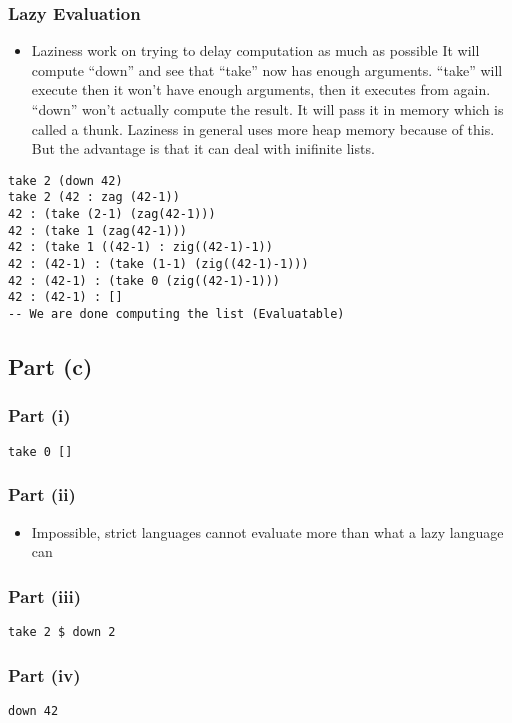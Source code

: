 \documentclass[11pt]{article}
\begin{document}
\subsubsection{Lazy Evaluation}
\label{sec:org720641f}
\begin{itemize}
\item Laziness work on trying to delay computation as much as possible
It will compute ``down'' and see that ``take'' now has enough arguments.
``take'' will execute then it won't have enough arguments, then it executes from
again. ``down'' won't actually compute the result. It will pass it in memory
which is called a thunk. Laziness in general uses more heap memory because of this.
But the advantage is that it can deal with inifinite lists.
\end{itemize}
\begin{verbatim}
take 2 (down 42)
take 2 (42 : zag (42-1))
42 : (take (2-1) (zag(42-1)))
42 : (take 1 (zag(42-1)))
42 : (take 1 ((42-1) : zig((42-1)-1))
42 : (42-1) : (take (1-1) (zig((42-1)-1)))
42 : (42-1) : (take 0 (zig((42-1)-1)))
42 : (42-1) : []
-- We are done computing the list (Evaluatable)
\end{verbatim}
\subsection{Part (c)}
\label{sec:org4dfd7a6}
\subsubsection{Part (i)}
\label{sec:org2357a2e}
\begin{verbatim}
take 0 []
\end{verbatim}
\subsubsection{Part (ii)}
\label{sec:org7a906a8}
\begin{itemize}
\item Impossible, strict languages cannot evaluate more than
what a lazy language can
\end{itemize}
\subsubsection{Part (iii)}
\label{sec:org21d3304}
\begin{verbatim}
take 2 $ down 2
\end{verbatim}
\subsubsection{Part (iv)}
\label{sec:orgfb14891}
\begin{verbatim}
down 42
\end{verbatim}
\end{document}
